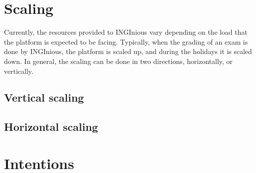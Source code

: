 \section{Scaling}
Currently, the resources provided to INGInious vary depending on the load that the platform is expected to be facing.  Typically, when the grading of an exam is done by INGInious, the platform is scaled up, and during the holidays it is scaled down.  
In general, the scaling can be done in two directions, horizontally, or vertically.

\subsection{Vertical scaling}

\subsection{Horizontal scaling}

\section{Intentions}

